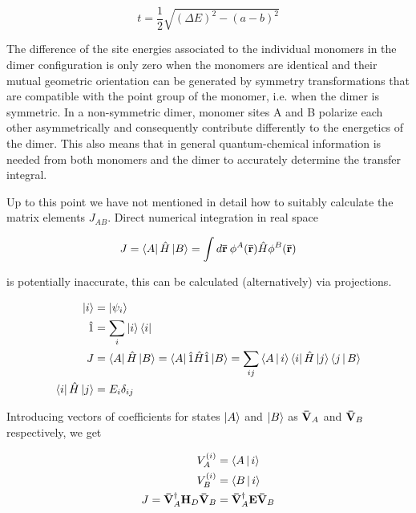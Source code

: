 \begin{equation}
  t = \frac{1}{2}
  \sqrt{ (\Delta E)^2 - (a - b)^2 }
   \label{eq:dipro_eq14}
\end{equation}

The difference of the site energies associated to the individual
monomers in the dimer configuration is only zero when 
the monomers are identical and their mutual geometric
orientation can be generated by symmetry transformations
that are compatible with the point group of the monomer,
i.e. when the dimer is symmetric. In a non-symmetric dimer,
monomer sites A and B polarize each other asymmetrically
and consequently contribute differently to the energetics of the
dimer. This also means that in general quantum-chemical
information is needed from both monomers and the dimer
to accurately determine the transfer integral.


Up to this point we have not mentioned in detail how to
suitably calculate the matrix elements $J_{AB}$. Direct numerical
integration in real space

\begin{equation}
  J = 
  \Bra{A} \hat{ H } \Ket{B} = \int d \mathbf{ \bar{r} } \:
  \phi^A (\mathbf{ \bar{r} }) \hat{ H } \phi^B (\mathbf{ \bar{r} })
   \label{eq:dipro_eq15}
\end{equation}

is potentially inaccurate, this can be calculated (alternatively) 
via projections.

\begin{equation}
 \begin{aligned}
  \Ket{i} &= \Ket{\psi_i} \\
 \hat{ 1 } &= \sum_i \Ket{i}\Bra{i} \\
 J &= 
 \Bra{A} \hat{ H } \Ket{B} = 
 \Bra{A} \hat{ 1 } \hat{ H } \hat{ 1 } \Ket{B} = 
 \sum_{ij} \Braket{A|i}\Bra{i}\hat{ H }\Ket{j}\Braket{j|B} \\
 \Bra{i}\hat{ H }\Ket{j} &= E_i \delta_{ij}
 \end{aligned}
  \label{eq:dipro_eq16}
\end{equation}

Introducing vectors of coefficients for states $\Ket{A}$ and $\Ket{B}$
as $\mathbf{ \bar{V} }_A$ and $\mathbf{ \bar{V} }_B$ respectively, we get

\begin{equation}
 \begin{aligned}
  V_{A}^{(i)} &= \Braket{A|i} \\
  V_{B}^{(i)} &= \Braket{B|i} \\
  J = 
  \mathbf{ \bar{V} }_A^\dagger \mathbf{ H }_D \mathbf{ \bar{V} }_B &= 
  \mathbf{ \bar{V} }_A^\dagger \mathbf{ E }   \mathbf{ \bar{V} }_B
 \end{aligned}
  \label{eq:dipro_eq17}
\end{equation}

